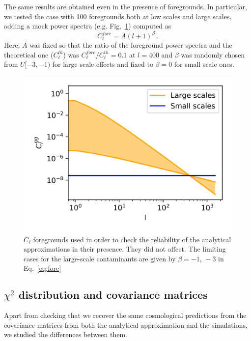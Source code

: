 \documentclass[useAMS,usenatbib]{mn2e}
\newcommand{\clth}{C_\ell^{th}}
\newcommand{\clf}{C_\ell^{fore}}
\newcommand{\cl}{C_\ell}
\begin{document}
The same results are obtained even in the presence of foregrounds. In
particular, we tested the case with 100 foregrounds both at low scales and
large scales, adding a mock power spectra (e.g. Fig.~\ref{fig:fore}) computed as 
\begin{equation}
  \clf = A (l + 1)^{\beta}\,.
  \label{eq:fore}
\end{equation}
Here, $A$ was fixed so that the ratio of the foreground power spectra and the
theoretical one ($\clth$) was $\clf/\clth = 0.1$ at $l=400$ and $\beta$ was
randomly chosen from $U[-3, -1)$ for large scale effects and fixed to $\beta =
0$ for small scale ones. 

\begin{figure}
  \centering
  \includegraphics[width=\columnwidth]{./figures/foreground.png}
  \caption{$\cl$ foregrounds used in order to check the reliability of the
    analytical approximations in their presence. They did not affect. The
    limiting cases for the large-scale contaminants are given by $\beta=-1,\,
    -3$ in Eq.~\ref{eq:fore}}
  \label{fig:fore}
\end{figure}

\subsection{$\chi^2$ distribution and covariance matrices}
Apart from checking that we recover the same cosmological predictions from the
covariance matrices from both the analytical approximation and the
simulations, we studied the differences between them.
\end{document}
